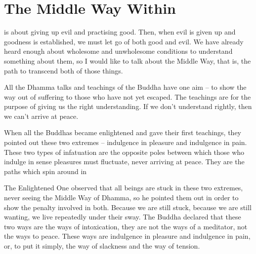 
\chapter{The Middle Way Within}

 is about giving up evil and practising good. Then, when evil is given up and goodness is established, we must let go of both good and evil. We have already heard enough about wholesome and unwholesome conditions to understand something about them, so I would like to talk about the Middle Way, that is, the path to transcend both of those things.

All the Dhamma talks and teachings of the Buddha have one aim -- to show the way out of suffering to those who have not yet escaped. The teachings are for the purpose of giving us the right understanding. If we don't understand rightly, then we can't arrive at peace.

When all the Buddhas became enlightened and gave their first teachings, they pointed out these two extremes -- indulgence in pleasure and indulgence in pain. These two types of infatuation are the opposite poles between which those who indulge in sense pleasures must fluctuate, never arriving at peace. They are the paths which spin around in 

The Enlightened One observed that all beings are stuck in these two extremes, never seeing the Middle Way of Dhamma, so he pointed them out in order to show the penalty involved in both. Because we are still stuck, because we are still wanting, we live repeatedly under their sway. The Buddha declared that these two ways are the ways of intoxication, they are not the ways of a meditator, not the ways to peace. These ways are indulgence in pleasure and indulgence in pain, or, to put it simply, the way of slackness and the way of tension.

